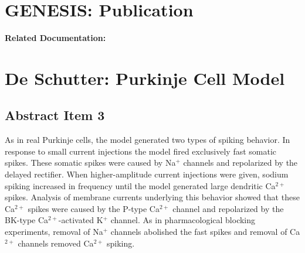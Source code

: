 \documentclass[12pt]{article}
\begin{document}
\section*{GENESIS: Publication}

{\bf Related Documentation:}

\section*{De Schutter: Purkinje Cell Model}

\subsection*{Abstract Item 3}

As in real Purkinje cells, the model generated two types of
spiking behavior. In response to small current injections the
model fired exclusively fast somatic spikes. These somatic spikes
were caused by Na$^+$ channels and repolarized by the delayed rectifier.
When higher-amplitude current injections were given, sodium
spiking increased in frequency until the model generated
large dendritic Ca$^{2+}$ spikes. Analysis of membrane currents underlying this 
behavior showed that these Ca$^{2+}$ spikes were caused by
the P-type Ca$^{2+}$ channel and repolarized by the BK-type Ca$^{2+}$-activated
K$^+$ channel. As in pharmacological blocking experiments,
removal of Na$^+$ channels abolished the fast spikes and removal of
Ca$^{2+}$ channels removed Ca$^{2+}$ spiking.
\end{document}

